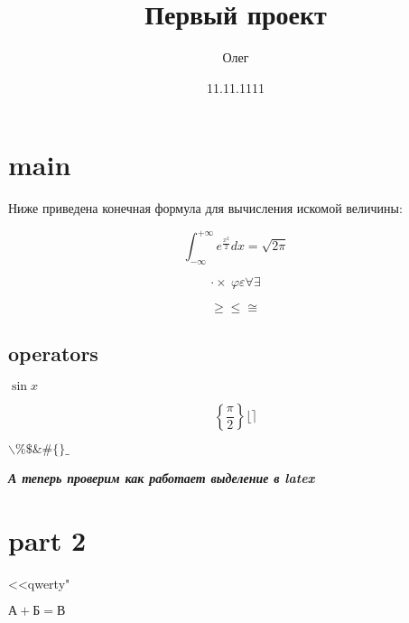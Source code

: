 


\pagestyle{main}


\begin{titlepage}
    \title{Первый проект}
    \author{Олег}
    \date{11.11.1111}
    \maketitle
\end{titlepage}
 




\tableofcontents
\newpage








\section*{\centering main}

Ниже приведена конечная формула для вычисления искомой величины:

\[\int_{-\infty}^{+\infty} e^{\frac{x^2}{2}}dx=\sqrt{2\pi}\]

\[\cdot \times\ \varphi \varepsilon \forall \exists\]

\[\ge \le   \cong\]

\subsection{operators}$\sin{x}$

\[\left\{\frac{\pi}{2}\right\}  \lfloor \rceil\]

$\backslash \%       \$ \& \#       \{ \} \_$

\textit{\textbf{{А теперь проверим как работает выделение в latex}}}

\section[2]{part 2}
<<qwerty"

$\text{А}+\text{Б}=\text{В}$





\appendix
